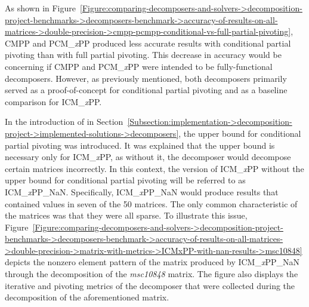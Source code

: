 As shown in Figure~\ref{Figure:comparing-decomposers-and-solvers->decomposition-project-benchmarks->decomposers-benchmark->accuracy-of-results-on-all-matrices->double-precision->cmpp-pcmpp-conditional-vs-full-partial-pivoting}, CMPP and PCM\_\textit{x}PP produced less accurate results with conditional partial pivoting than with full partial pivoting. This decrease in accuracy would be concerning if CMPP and PCM\_\textit{x}PP were intended to be fully-functional decomposers. However, as previously mentioned, both decomposers primarily served as a proof-of-concept for conditional partial pivoting and as a baseline comparison for ICM\_\textit{x}PP.

In the introduction of  in Section~\ref{Subsection:implementation->decomposition-project->implemented-solutions->decomposers}, the upper bound for conditional partial pivoting was introduced. It was explained that the upper bound is necessary only for ICM\_\textit{x}PP, as without it, the decomposer would decompose certain matrices incorrectly. In this context, the version of ICM\_\textit{x}PP without the upper bound for conditional partial pivoting will be referred to as ICM\_\textit{x}PP\_NaN. Specifically, ICM\_\textit{x}PP\_NaN would produce results that contained  values in seven of the 50 matrices. The only common characteristic of the matrices was that they were all sparse. To illustrate this issue, Figure~\ref{Figure:comparing-decomposers-and-solvers->decomposition-project-benchmarks->decomposers-benchmark->accuracy-of-results-on-all-matrices->double-precision->matrix-with-metrics->ICMxPP-with-nan-results->msc10848} depicts the nonzero element pattern of the  matrix produced by ICM\_\textit{x}PP\_NaN through the decomposition of the \textit{msc10848} matrix. The figure also displays the iterative and pivoting metrics of the decomposer that were collected during the decomposition of the aforementioned matrix.

